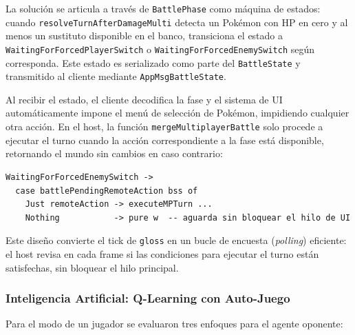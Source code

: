 La solución se articula a través de \texttt{BattlePhase} como máquina de estados: cuando \texttt{resolveTurnAfterDamageMulti} detecta un Pokémon con HP en cero y al menos un sustituto disponible en el banco, transiciona el estado a \texttt{WaitingForForcedPlayerSwitch} o \texttt{WaitingForForcedEnemySwitch} según corresponda. Este estado es serializado como parte del \texttt{BattleState} y transmitido al cliente mediante \texttt{AppMsgBattleState}.

Al recibir el estado, el cliente decodifica la fase y el sistema de UI automáticamente impone el menú de selección de Pokémon, impidiendo cualquier otra acción. En el host, la función \texttt{mergeMultiplayerBattle} solo procede a ejecutar el turno cuando la acción correspondiente a la fase está disponible, retornando el mundo sin cambios en caso contrario:

\begin{verbatim}
WaitingForForcedEnemySwitch ->
  case battlePendingRemoteAction bss of
    Just remoteAction -> executeMPTurn ...
    Nothing           -> pure w  -- aguarda sin bloquear el hilo de UI
\end{verbatim}

Este diseño convierte el tick de \texttt{gloss} en un bucle de encuesta (\textit{polling}) eficiente: el host revisa en cada frame si las condiciones para ejecutar el turno están satisfechas, sin bloquear el hilo principal.

\subsubsection*{Inteligencia Artificial: Q-Learning con Auto-Juego}

Para el modo de un jugador se evaluaron tres enfoques para el agente oponente:

